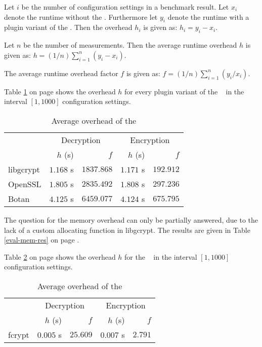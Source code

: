 
Let $i$ be the number of configuration settings in a benchmark result.
Let $x_i$ denote the runtime without the \crypto.
Furthermore let $y_i$ denote the runtime with a plugin variant of the \crypto.
Then the overhead $h_i$ is given as: $h_i=y_i - x_i$.

Let $n$ be the number of measurements.
Then the average runtime overhead $h$ is given as: $h=(1/n) \sum_{i=1}^{n}(y_i - x_i)$.

The average runtime overhead factor $f$ is given as: $f=(1/n) \sum_{i=1}^{n}(y_i/x_i)$.

Table \ref{concl-time-crypto} on page \pageref{concl-time-crypto} shows the overhead $h$ for every plugin variant of the \crypto~ in the interval $[1,1000]$ configuration settings.

\begin{table}[h]
\centering
\caption{Average overhead of the \crypto}
\label{concl-time-crypto}
\begin{tabular}{l|rr|rr}
          & \multicolumn{2}{c|}{Decryption} & \multicolumn{2}{c}{Encryption} \\ \cline{2-5}
          & $h$ (s)      & $f$           & $h$ (s)       & $f$          \\ \hline
libgcrypt & $1.168$ s    & $1837.868$    & $1.171$ s     & $192.912$    \\
OpenSSL   & $1.805$ s    & $2835.492$    & $1.808$ s     & $297.236$    \\
Botan     & $4.125$ s    & $6459.077$    & $4.124$ s     & $675.795$
\end{tabular}
\end{table}

The question for the memory overhead can only be partially answered, due to the lack of a custom allocating function in libgcrypt.
The results are given in Table \ref{eval-mem-res} on page \pageref{eval-mem-res}.


Table \ref{concl-time-fcrypt} on page \pageref{concl-time-fcrypt} shows the overhead $h$ for the \fcrypt~ in the interval $[1,1000]$ configuration settings.

\begin{table}[h]
\centering
\caption{Average overhead of the \fcrypt}
\label{concl-time-fcrypt}
\begin{tabular}{l|rr|rr}
          & \multicolumn{2}{c|}{Decryption} & \multicolumn{2}{c}{Encryption} \\ \cline{2-5}
          & $h$ (s)      & $f$           & $h$ (s)       & $f$          \\ \hline
fcrypt    & $0.005$ s    & $25.609$      & $0.007$ s     & $2.791$     
\end{tabular}
\end{table}


